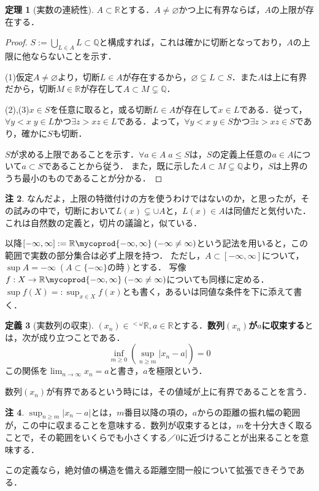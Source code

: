 \documentclass[uplatex, 12pt, dvipdfmx]{jsreport}
\theoremstyle{definition}
\newtheorem{theorem}{定理}[section]
\newtheorem{definition}[theorem]{定義}
\newtheorem{remark}[theorem]{注}
\theoremstyle{StatementsWithStar}
\theoremstyle{StatementsWithStar2}
\theoremstyle{StatementsWithStar3}
\theoremstyle{StatementsWithCCirc}
\theoremstyle{definition}
\let\coprod\mycoprod
\begin{document}
\begin{theorem}[実数の連続性]
    $A\subset\mathbb{R}$とする．$A\ne\varnothing$かつ上に有界ならば，$A$の上限が存在する．
\end{theorem}
\begin{proof}
    $S:=\bigcup_{L\in A}L\subset\mathbb{Q}$と構成すれば，これは確かに切断となっており，$A$の上限に他ならないことを示す．

    (1)仮定$A\ne\varnothing$より，切断$L\in A$が存在するから，$\varnothing\subsetneq L\subset S$．また$A$は上に有界だから，切断$M\in\mathbb{R}$が存在して$A\subset M\subsetneq\mathbb{Q}$．
    
    (2),(3)$x\in S$を任意に取ると，或る切断$L\in A$が存在して$x\in L$である．従って，$\forall y<x\; y\in L$かつ$\exists z>x z\in L$である．よって，$\forall y<x\; y\in S$かつ$\exists z>x z\in S$であり，確かに$S$も切断．

    $S$が求める上限であることを示す．$\forall a\in A\; a\le S$は，$S$の定義上任意の$a\in A$について$a\subset S$であることから従う．
    また，既に示した$A\subset M\subsetneq\mathbb{Q}$より，$S$は上界のうち最小のものであることが分かる．
\end{proof}
\begin{remark}
    なんだよ，上限の特徴付けの方を使うわけではないのか，と思ったが，その試みの中で，切断において$L(x)\subsetneq \cup A$と，$L(x)\in A$は同値だと気付いた．これは自然数の定義と，切片の議論と，似ている．
\end{remark}

以降$[-\infty,\infty]:=\mathbb{R}\coprod\{-\infty,\infty\}\;(-\infty\ne\infty)$という記法を用いると，この範囲で実数の部分集合は必ず上限を持つ．
ただし，$A\subset [-\infty,\infty]$について，$\sup A=-\infty \; (A\subset \{-\infty\}の時)$とする．
写像$f:X\to\mathbb{R}\coprod\{-\infty,\infty\}\;(-\infty\ne\infty)$についても同様に定める．
$\sup f(X)=:\sup_{x\in X}f(x)$とも書く，あるいは同値な条件を下に添えて書く．

\begin{definition}[実数列の収束]
    $(x_n)\in{}^{<\omega}\mathbb{R},a\in\mathbb{R}$とする．\textbf{数列$(x_n)$が$a$に収束する}とは，次が成り立つことである．
    \[ \inf_{m\ge 0}\left(\sup_{n\ge m}|x_n-a|\right)=0 \]
    この関係を$\lim_{n\to\infty}x_n=a$と書き，$a$を極限という．

    数列$(x_n)$が有界であるという時には，その値域が上に有界であることを言う．
\end{definition}
\begin{remark}
    $\sup_{n\ge m}|x_n-a|$とは，$m$番目以降の項の，$a$からの距離の振れ幅の範囲が，この中に収まることを意味する．数列が収束するとは，$m$を十分大きく取ることで，その範囲をいくらでも小さくする／$0$に近づけることが出来ることを意味する．

    この定義なら，絶対値の構造を備える距離空間一般について拡張できそうである．
\end{remark}
\end{document}
